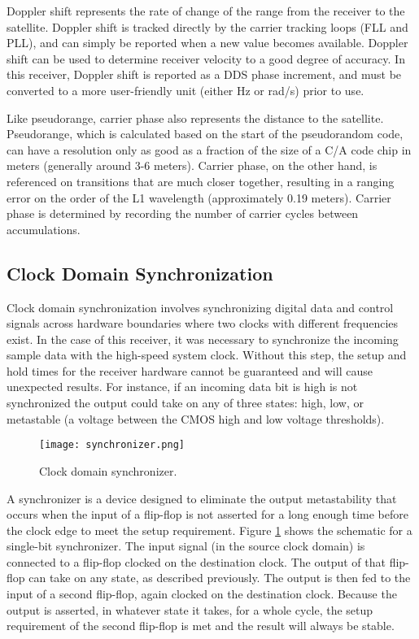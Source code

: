 \documentclass[12pt]{article}
\begin{document}
Doppler shift represents the rate of change of the range from the receiver to the satellite. Doppler shift is tracked directly by the carrier tracking loops (FLL and PLL), and can simply be reported when a new value becomes available. Doppler shift can be used to determine receiver velocity to a good degree of accuracy. In this receiver, Doppler shift is reported as a DDS phase increment, and must be converted to a more user-friendly unit (either Hz or rad/s) prior to use.

Like pseudorange, carrier phase also represents the distance to the satellite. Pseudorange, which is calculated based on the start of the pseudorandom code, can have a resolution only as good as a fraction of the size of a C/A code chip in meters (generally around 3-6 meters). \cite{trimble} Carrier phase, on the other hand, is referenced on transitions that are much closer together, resulting in a ranging error on the order of the L1 wavelength (approximately 0.19 meters). Carrier phase is determined by recording the number of carrier cycles between accumulations.

\subsection{Clock Domain Synchronization}
Clock domain synchronization involves synchronizing digital data and control signals across hardware boundaries where two clocks with different frequencies exist. In the case of this receiver, it was necessary to synchronize the incoming sample data with the high-speed system clock. Without this step, the setup and hold times for the receiver hardware cannot be guaranteed and will cause unexpected results. For instance, if an incoming data bit is high is not synchronized the output could take on any of three states: high, low, or metastable (a voltage between the CMOS high and low voltage thresholds).

\begin{figure}
\centering
\texttt{[image: synchronizer.png]}
\caption{Clock domain synchronizer.}
\label{img:synchronizer}
\end{figure}

A synchronizer is a device designed to eliminate the output metastability that occurs when the input of a flip-flop is not asserted for a long enough time before the clock edge to meet the setup requirement. Figure \ref{img:synchronizer} shows the schematic for a single-bit synchronizer. The input signal (in the source clock domain) is connected to a flip-flop clocked on the destination clock. The output of that flip-flop can take on any state, as described previously. The output is then fed to the input of a second flip-flop, again clocked on the destination clock. Because the output is asserted, in whatever state it takes, for a whole cycle, the setup requirement of the second flip-flop is met and the result will always be stable.
\end{document}
